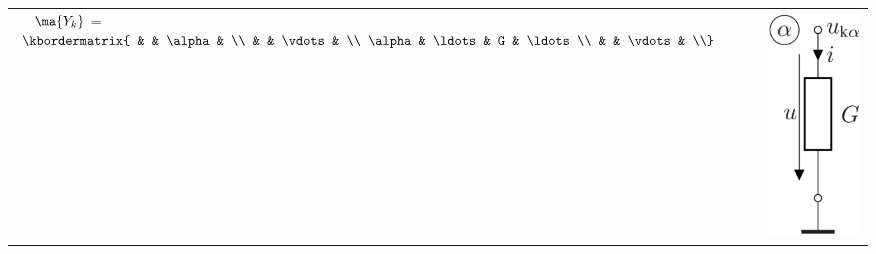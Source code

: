 \documentclass[fs, footer]{latex4ei}
\begin{document}
\begin{multicols*}{4}
\begin{tabular}{ll}
        $\ \ \ \ \ma {Y_k}$ =
        $\kbordermatrix{ &        & \alpha &                                                                                                                                                                                                                                                     \\
                         &        & \vdots &                                                                                                                                                                                                                                                     \\
        \alpha           & \ldots & G      & \ldots                                                                                                                                                                                                                                              \\
                         &        & \vdots & \\}$ & \parbox{3cm}{\includegraphics[scale=0.15]{./img/nodevoltageanalysis/conductance_a_gnd.png} }                                                                                                                           \\
    \end{tabular}


\end{multicols*}
\end{document}
